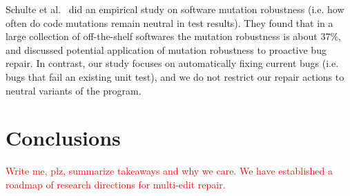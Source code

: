 \documentclass[sigconf, timestamp-false, anonymous=true]{acmart}
\newcommand\todo[1]{\textcolor{red}{#1}}
\begin{document}
Schulte et al.~\cite{schulte} did an empirical study on software mutation robustness 
(i.e. how often do code mutations remain neutral in test results). 
They found that in a large collection of off-the-shelf softwares the mutation robustness is about 37\%, 
and discussed potential application of mutation robustness to proactive bug repair. 
In contrast, our study focuses on automatically fixing current bugs (i.e. bugs that fail an existing unit test), 
and we do not restrict our repair actions to neutral variants of the program.

\section{Conclusions}
\label{sec:conclusions}

\todo{Write me, plz, summarize takeaways and why we care.  We have established a
  roadmap of research directions for multi-edit repair.}



\end{document}
